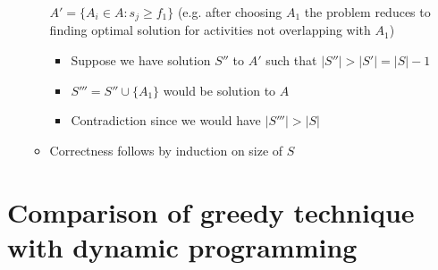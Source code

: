 \documentclass[11pt]{article}
\begin{document}
\begin{itemize}
\begin{itemize}
        $A' = \{ A_i \in A: s_j \geq f_1 \}$ (e.g. after choosing $A_1$ the
        problem reduces to finding optimal solution for activities not
        overlapping with $A_1$)
                \begin{itemize}
                \item Suppose we have solution $S''$ to $A'$ such that
                $\vert S'' \vert > \vert S' \vert = \vert S \vert - 1$
                \item $S''' = S'' \cup \{ A_1 \}$ would be solution to $A$
                \item Contradiction since we would have $\vert S''' \vert >
                \vert S \vert$
                \end{itemize}
        \item Correctness follows by induction on size of $S$
        \end{itemize}
\end{itemize}


\section{Comparison of greedy technique with dynamic programming}
\end{document}
